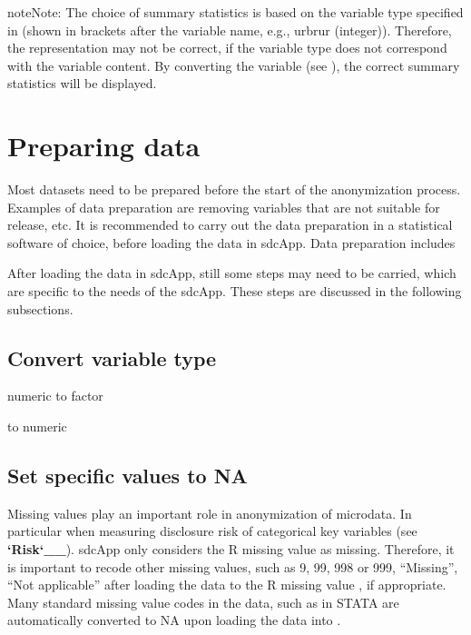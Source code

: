 \documentclass[letterpaper,10pt,english]{sphinxmanual}
\begin{document}
\begin{sphinxadmonition}{note}{Note:}
The choice of summary statistics is based on the variable type specified in  (shown in
brackets after the variable name, e.g., urbrur (integer)). Therefore,
the representation may not be correct, if the variable type does not correspond
with the variable content. By converting the variable (see {\hyperref[\detokenize{loadprepdata:convert-variable-type}]{}}),
the correct summary statistics will be displayed.
\end{sphinxadmonition}


\section{Preparing data}
\label{\detokenize{loadprepdata:preparing-data}}
Most datasets need to be prepared before the start of the anonymization process. Examples
of data preparation are removing variables that are not suitable for release, etc. It is
recommended to carry out the data preparation in a statistical software of choice, before
loading the data in sdcApp. Data preparation includes

After loading the data in sdcApp, still some steps may need to be carried, which are
specific to the needs of the sdcApp. These steps are discussed in the following subsections.


\subsection{Convert variable type}
\label{\detokenize{loadprepdata:convert-variable-type}}
numeric to factor

to numeric


\subsection{Set specific values to NA}
\label{\detokenize{loadprepdata:set-specific-values-to-na}}
Missing values play an important role in anonymization of microdata. In particular when
measuring disclosure risk of categorical key variables (see {\color{red}\bfseries{}{}`Risk{}`\_\_}). sdcApp only considers
the R missing value  as missing. Therefore, it is important to recode other missing values,
such as 9, 99, 998 or 999, “Missing”, “Not applicable” after loading the
data to the R missing value , if appropriate. Many standard missing value codes
in the data, such as  in STATA are automatically converted to NA upon loading
the data into .
\end{document}
